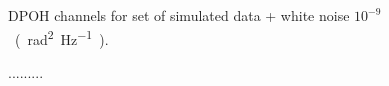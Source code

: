 \documentclass[ fontsize=11pt]{scrartcl} %
\numberwithin{equation}{section} %
\numberwithin{figure}{section} %
\numberwithin{table}{section} %
\begin{document}
\begin{center}
\begin{figure}[hbtp]
\caption{DPOH channels for set of simulated data + white noise $10^{-9}$ \SI{}{(\radian\squared\per\hertz)}.}
\label{channels_noise}
\end{figure}
\end{center}

\begin{center}
\begin{figure}[hbtp]
\caption{.........}
\label{channels_psd}
\end{figure}
\end{center}
\end{document}
